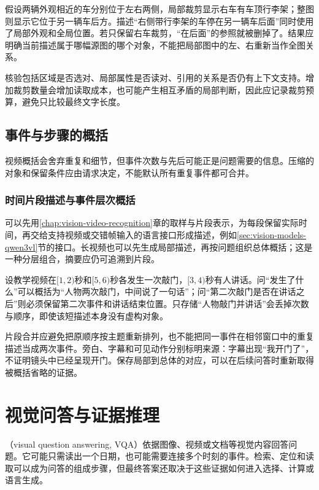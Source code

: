 假设两辆外观相近的车分别位于左右两侧，局部裁剪显示右车有车顶行李架；整图则显示它位于另一辆车后方。描述“右侧带行李架的车停在另一辆车后面”同时使用了局部外观和全局位置。若只保留右车裁剪，“在后面”的参照就被删掉了。结果应明确当前描述属于哪幅源图的哪个对象，不能把局部图中的左、右重新当作全图关系。

核验包括区域是否选对、局部属性是否读对、引用的关系是否仍有上下文支持。增加裁剪数量会增加读取成本，也可能产生相互矛盾的局部判断，因此应记录裁剪预算，避免只比较最终文字长度。

\subsection{事件与步骤的概括}
\label{sec:vision-understanding-event-caption}

视频概括会舍弃重复和细节，但事件次数与先后可能正是问题需要的信息。压缩的对象和保留条件应由请求决定，不能默认所有重复事件都可合并。

\subsubsection{时间片段描述与事件层次概括}
\label{sec:vision-understanding-hierarchical-caption}

可以先用\ref{chap:vision-video-recognition}章的取样与片段表示，为每段保留实际时间，再交给支持视频或交错帧输入的语言接口形成描述，例如\ref{sec:vision-models-qwen3vl}节的接口。长视频也可以先生成局部描述，再按问题组织总体概括；这是一种分层组合，摘要应仍可追溯到片段。

设教学视频在$[1,2)$秒和$[5,6)$秒各发生一次敲门，$[3,4)$秒有人讲话。问“发生了什么”可以概括为“人物两次敲门，中间说了一句话”；问“第二次敲门是否在讲话之后”则必须保留第二次事件和讲话结束位置。只存储“人物敲门并讲话”会丢掉次数与顺序，即使该短描述本身没有虚构对象。

片段合并应避免把原顺序按主题重新排列，也不能把同一事件在相邻窗口中的重复描述当成两次事件。旁白、字幕和可见动作分别标明来源：字幕出现“我开门了”，不证明镜头中已经呈现开门。保存局部到总体的对应，可以在后续问答时重新取得被概括省略的证据。

\section{视觉问答与证据推理}
\label{sec:vision-understanding-qa}

（visual question answering, VQA）依据图像、视频或文档等视觉内容回答问题。它可能只需读出一个日期，也可能需要连接多个时刻的事件。检索、定位和读取可以成为问答的组成步骤，但最终答案还取决于这些证据如何进入选择、计算或语言生成。

